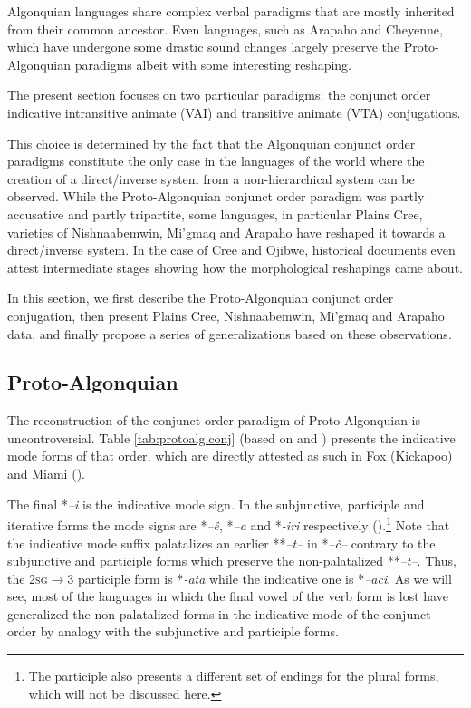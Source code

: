 \documentclass[twoside,a4paper,11pt]{article}
\newcommand{\ipa}[1]{{\phon\textit{#1}}}
\newcommand{\sg}{\textsc{sg}}
\begin{document}
Algonquian languages share complex verbal paradigms that are mostly inherited from their common ancestor. Even languages, such as Arapaho and Cheyenne, which have undergone some drastic sound changes largely preserve the Proto-Algonquian paradigms albeit with some interesting reshaping.

The present section focuses on two particular paradigms: the conjunct order indicative intransitive animate (VAI) and transitive animate (VTA) conjugations. 

This choice is determined by the fact that the Algonquian conjunct order paradigms constitute the only case in the languages of the world where the creation of a direct/inverse system from a non-hierarchical system can be observed. While the Proto-Algonquian conjunct order paradigm was partly accusative and partly tripartite, some languages, in particular Plains Cree, varieties of Nishnaabemwin, Mi'gmaq and  Arapaho have reshaped it towards a direct/inverse system. In the case of Cree and Ojibwe, historical documents even attest intermediate stages showing how the morphological reshapings came about.

In this section, we first describe the Proto-Algonquian conjunct order conjugation, then present Plains Cree, Nishnaabemwin, Mi'gmaq and Arapaho data, and finally propose a series of generalizations based on these observations.

\subsection{Proto-Algonquian}
The reconstruction of the conjunct order paradigm of Proto-Algonquian is uncontroversial. Table \ref{tab:protoalg.conj} (based on \citealt{bloomfield46proto} and \citealt{goddard00cheyenne}) presents the indicative mode forms of that order, which are directly attested as such in Fox (Kickapoo) and Miami (\citealt{costa03miami}).

The final *\ipa{--i} is the indicative mode sign. In the subjunctive, participle and iterative forms the mode signs are *\ipa{--ê}, *\ipa{--a} and *\ipa{-iri} respectively (\citealt[295]{oxford14microparameters}).\footnote{The participle also presents a different set of endings for the plural forms, which will not be discussed here.} Note that the indicative mode suffix palatalizes an earlier **\ipa{--t--} in *\ipa{--č--} contrary to the subjunctive and participle forms which preserve the non-palatalized **\ipa{--t--}. Thus, the 2\sg$\rightarrow$3 participle form is *\ipa{-ata} while the indicative one is *\ipa{--aci}. As we will see, most of the languages in which the final vowel of the verb form is lost have generalized the non-palatalized forms in the indicative mode of the conjunct order by analogy with the subjunctive and participle forms.
\end{document}
